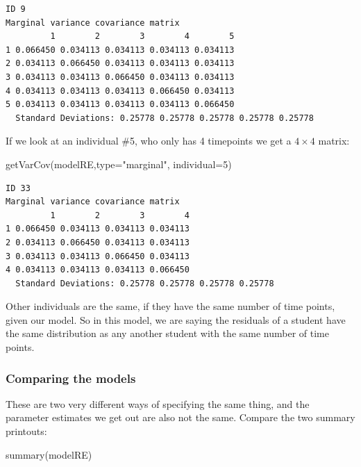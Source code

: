 \documentclass[
  letterpaper,
  DIV=11,
  numbers=noendperiod]{scrreprt}
\newenvironment{Shaded}{}{}
\newcommand{\AttributeTok}[1]{\textcolor[rgb]{0.49,0.56,0.16}{#1}}
\newcommand{\DecValTok}[1]{\textcolor[rgb]{0.25,0.63,0.44}{#1}}
\newcommand{\FunctionTok}[1]{\textcolor[rgb]{0.02,0.16,0.49}{#1}}
\newcommand{\NormalTok}[1]{#1}
\newcommand{\StringTok}[1]{\textcolor[rgb]{0.25,0.44,0.63}{#1}}
\begin{document}
\begin{verbatim}
ID 9 
Marginal variance covariance matrix
         1        2        3        4        5
1 0.066450 0.034113 0.034113 0.034113 0.034113
2 0.034113 0.066450 0.034113 0.034113 0.034113
3 0.034113 0.034113 0.066450 0.034113 0.034113
4 0.034113 0.034113 0.034113 0.066450 0.034113
5 0.034113 0.034113 0.034113 0.034113 0.066450
  Standard Deviations: 0.25778 0.25778 0.25778 0.25778 0.25778 
\end{verbatim}

If we look at an individual \#5, who only has 4 timepoints we get a
\(4 \times 4\) matrix:

\begin{Shaded}
\begin{Highlighting}[]
\FunctionTok{getVarCov}\NormalTok{(modelRE,}\AttributeTok{type=}\StringTok{"marginal"}\NormalTok{, }\AttributeTok{individual=}\DecValTok{5}\NormalTok{)}
\end{Highlighting}
\end{Shaded}

\begin{verbatim}
ID 33 
Marginal variance covariance matrix
         1        2        3        4
1 0.066450 0.034113 0.034113 0.034113
2 0.034113 0.066450 0.034113 0.034113
3 0.034113 0.034113 0.066450 0.034113
4 0.034113 0.034113 0.034113 0.066450
  Standard Deviations: 0.25778 0.25778 0.25778 0.25778 
\end{verbatim}

Other individuals are the same, if they have the same number of time
points, given our model. So in this model, we are saying the residuals
of a student have the same distribution as any another student with the
same number of time points.

\subsubsection{Comparing the models}\label{comparing-the-models-1}

These are two very different ways of specifying the same thing, and the
parameter estimates we get out are also not the same. Compare the two
summary printouts:

\begin{Shaded}
\begin{Highlighting}[]
\FunctionTok{summary}\NormalTok{(modelRE)}
\end{Highlighting}
\end{Shaded}
\end{document}
